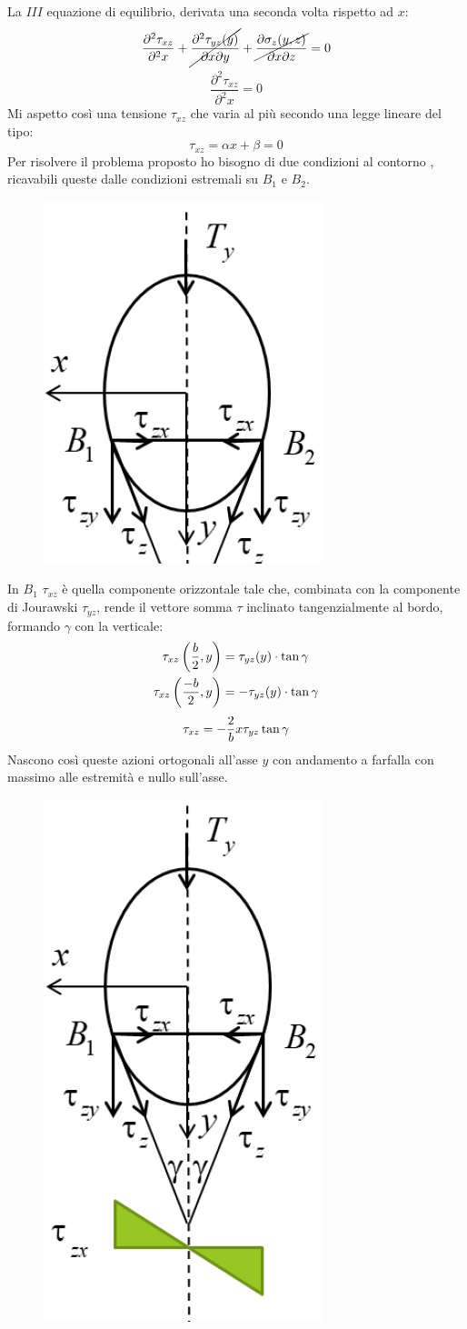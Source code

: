 		La $III$ equazione di equilibrio, derivata una seconda volta rispetto ad $x$:
		\[\frac{\partial^2 \tau_{xz}}{\partial^2 x} + \cancel{\frac{\partial^2 \tau_{yz}(y)}{\partial x\partial y}} + \cancel{\frac{\partial\sigma_z(y,z)}{\partial x\partial z}}  =0\]
		\[ \frac{\partial^2 \tau_{xz}}{\partial^2 x} = 0\]
		Mi aspetto così una tensione $\tau_{xz}$ che varia al più secondo una legge lineare del tipo: 
		\[\tau_{xz} = \alpha x + \beta = 0\]
		Per risolvere il problema proposto ho bisogno di due condizioni al contorno , ricavabili queste dalle condizioni estremali su $B_1$ e $ B_2 $. 
		
\begin{figure}[H]
	\centering
	\label{fig:screenshot008.1}
	\includegraphics[width=0.2\linewidth]{immagini_6/screenshot008.1}
\end{figure}
		
		In $B_1$ $ \tau_{xz} $ è quella componente orizzontale tale che, combinata con la componente di Jourawski $ \tau_{yz} $, rende il vettore somma $\tau$ inclinato tangenzialmente al bordo, formando $\gamma$ con la verticale:
		\[ \begin{aligned}
			\tau_{xz}\left({b\over 2}, y\right) & = \tau_{yz}(y)\cdot \tan\gamma \\
			\tau_{xz}\left({-b\over 2}, y\right) & = -\tau_{yz}(y)\cdot \tan\gamma
		\end{aligned}\]
	 	\[ \tau_{xz} = -{2\over b}x\tau_{yz}\tan\gamma\]
	 	Nascono così queste azioni ortogonali all'asse $y$ con andamento a farfalla con massimo alle estremità e nullo sull'asse. 
	 	
\begin{figure}[H]
	\centering
	\label{fig:screenshot008.2}
	\includegraphics[width=0.15\linewidth]{immagini_6/screenshot008.2}
\end{figure}

